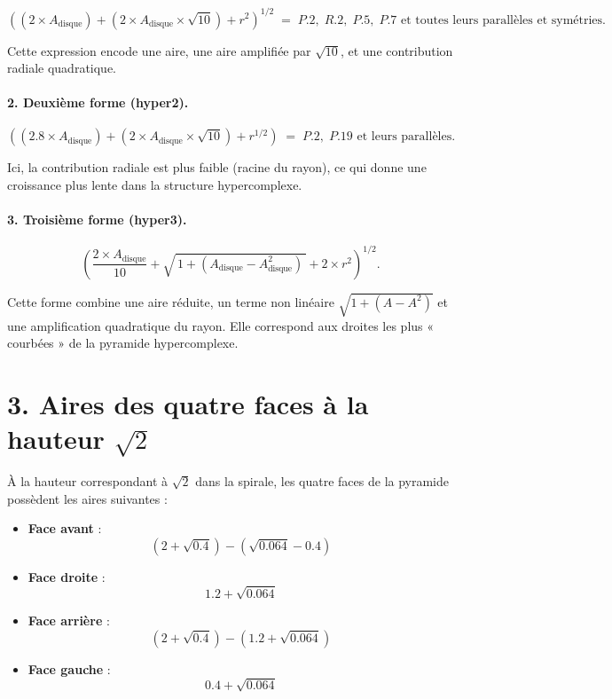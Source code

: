 \documentclass[12pt]{article}
\begin{document}
\[
\left( (2 \times A_{\text{disque}}) +
       (2 \times A_{\text{disque}} \times \sqrt{10}) +
       r^2 \right)^{1/2}
\;=\; P.2,\; R.2,\; P.5,\; P.7
\text{ et toutes leurs parallèles et symétries.}
\]



Cette expression encode une aire, une aire amplifiée par $\sqrt{10}$,
et une contribution radiale quadratique.

\paragraph{2. Deuxième forme (hyper2).}


\[
\left( (2.8 \times A_{\text{disque}}) +
       (2 \times A_{\text{disque}} \times \sqrt{10}) +
       r^{1/2} \right)
\;=\; P.2,\; P.19
\text{ et leurs parallèles.}
\]



Ici, la contribution radiale est plus faible (racine du rayon), ce qui
donne une croissance plus lente dans la structure hypercomplexe.

\paragraph{3. Troisième forme (hyper3).}


\[
\left(
  \frac{2 \times A_{\text{disque}}}{10}
  + \sqrt{\,1 + (A_{\text{disque}} - A_{\text{disque}}^2)\,}
  + 2 \times r^2
\right)^{1/2}.
\]



Cette forme combine une aire réduite, un terme non linéaire
$\sqrt{1 + (A - A^2)}$ et une amplification quadratique du rayon.
Elle correspond aux droites les plus « courbées » de la pyramide
hypercomplexe.

\section*{3. Aires des quatre faces à la hauteur $\sqrt{2}$}

À la hauteur correspondant à $\sqrt{2}$ dans la spirale, les quatre faces de la pyramide possèdent les aires suivantes :

\begin{itemize}
    \item \textbf{Face avant} :
    \[
    (2 + \sqrt{0.4}) - (\sqrt{0.064} - 0.4)
    \]
    \item \textbf{Face droite} :
    \[
    1.2 + \sqrt{0.064}
    \]
    \item \textbf{Face arrière} :
    \[
    (2 + \sqrt{0.4}) - (1.2 + \sqrt{0.064})
    \]
    \item \textbf{Face gauche} :
    \[
    0.4 + \sqrt{0.064}
    \]
\end{itemize}
\end{document}
